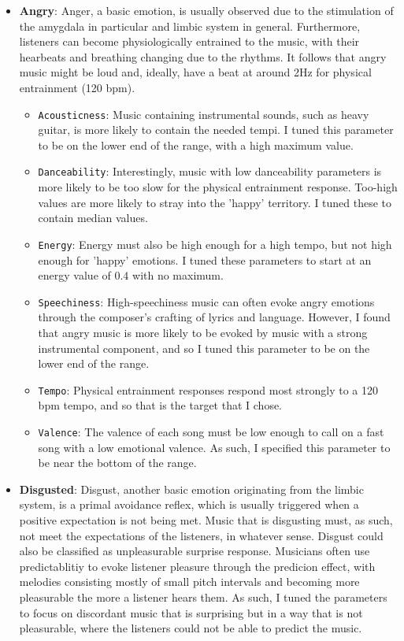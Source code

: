\documentclass{article}
\renewcommand{\_}[1]{\underline{ #1 }}
\theoremstyle{definition}
\begin{document}
\begin{itemize}
    \item \textbf{Angry}: Anger, a basic emotion, is usually observed due to the stimulation of the amygdala in particular and limbic system in general. Furthermore, listeners can become physiologically entrained to the music, with their hearbeats and breathing changing due to the rhythms. It follows that angry music might be loud and, ideally, have a beat at around 2Hz for physical entrainment (120 bpm). 

        \begin{itemize}
            \item \texttt{Acousticness}: Music containing instrumental sounds, such as heavy guitar, is more likely to contain the needed tempi. I tuned this parameter to be on the lower end of the range, with a high maximum value. 
            \item \texttt{Danceability}: Interestingly, music with low danceability parameters is more likely to be too slow for the physical entrainment response. Too-high values are more likely to stray into the 'happy' territory. I tuned these to contain median values. 
            \item \texttt{Energy}: Energy must also be high enough for a high tempo, but not high enough for 'happy' emotions. I tuned these parameters to start at an energy value of $0.4$ with no maximum. 
            \item \texttt{Speechiness}: High-speechiness music can often evoke angry emotions through the composer's crafting of lyrics and language. However, I found that angry music is more likely to be evoked by music with a strong instrumental component, and so I tuned this parameter to be on the lower end of the range.
            \item \texttt{Tempo}: Physical entrainment responses respond most strongly to a 120 bpm tempo, and so that is the target that I chose.
            \item \texttt{Valence}: The valence of each song must be low enough to call on a fast song with a low emotional valence. As such, I specified this parameter to be near the bottom of the range. 
        \end{itemize}

    \item \textbf{Disgusted}: Disgust, another basic emotion originating from the limbic system, is a primal avoidance reflex, which is usually triggered when a positive expectation is not being met. Music that is disgusting must, as such, not meet the expectations of the listeners, in whatever sense. Disgust could also be classified as unpleasurable surprise response. Musicians often use predictablitiy to evoke listener pleasure through the predicion effect, with melodies consisting mostly of small pitch intervals and becoming more pleasurable the more a listener hears them. As such, I tuned the parameters to focus on discordant music that is surprising but in a way that is not pleasurable, where the listeners could not be able to predict the music. 


\end{itemize}
\end{document}

